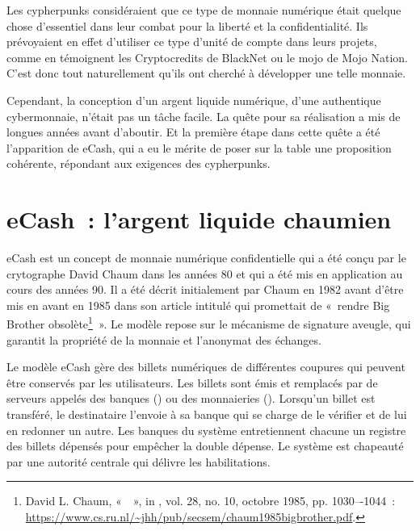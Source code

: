 Les cypherpunks considéraient que ce type de monnaie numérique était quelque chose d'essentiel dans leur combat pour la liberté et la confidentialité. Ils prévoyaient en effet d'utiliser ce type d'unité de compte dans leurs projets, comme en témoignent les Cryptocredits de BlackNet ou le mojo de Mojo Nation. C'est donc tout naturellement qu'ils ont cherché à développer une telle monnaie.

Cependant, la conception d'un argent liquide numérique, d'une authentique cybermonnaie, n'était pas un tâche facile. La quête pour sa réalisation a mis de longues années avant d'aboutir. Et la première étape dans cette quête a été l'apparition de eCash, qui a eu le mérite de poser sur la table une proposition cohérente, répondant aux exigences des cypherpunks.

\section*{eCash~: l'argent liquide chaumien}

eCash est un concept de monnaie numérique confidentielle qui a été conçu par le crytographe David Chaum dans les années 80 et qui a été mis en application au cours des années 90. Il a été décrit initialement par Chaum en 1982 avant d'être mis en avant en 1985 dans son article intitulé  qui promettait de «~rendre Big Brother obsolète\footnote{David L. Chaum, «~~», in , vol. 28, no. 10, octobre 1985, pp. 1030–-1044~: \url{https://www.cs.ru.nl/~jhh/pub/secsem/chaum1985bigbrother.pdf}.}~». Le modèle repose sur le mécanisme de signature aveugle, qui garantit la propriété de la monnaie et l'anonymat des échanges.

Le modèle eCash gère des billets numériques de différentes coupures qui peuvent être conservés par les utilisateurs. Les billets sont émis et remplacés par de serveurs appelés des banques () ou des monnaieries (). Lorsqu'un billet est transféré, le destinataire l'envoie à sa banque qui se charge de le vérifier et de lui en redonner un autre. Les banques du système entretiennent chacune un registre des billets dépensés pour empêcher la double dépense. Le système est chapeauté par une autorité centrale qui délivre les habilitations.


